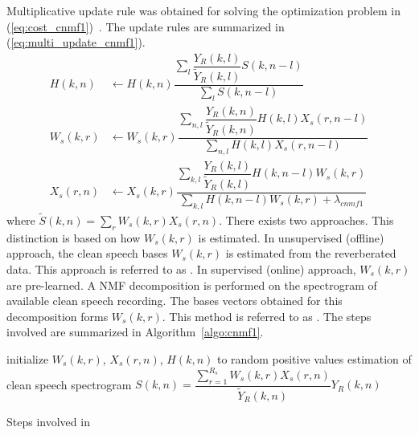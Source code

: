 Multiplicative update rule was obtained for solving the optimization problem in (\ref{eq:cost_cnmf1})~\cite{mohammadiha2016speech, Mohammadiha2015}. The update rules are summarized in (\ref{eq:multi_update_cnmf1}).
\begin{align}
H(k,n) & \leftarrow H(k,n) \dfrac{\sum\limits_l\dfrac{Y_R(k,l)}{\tilde{Y}_R(k,l)}S(k,n-l)}{\sum\limits_l S(k,n-l) } \nonumber \\
W_s(k,r) & \leftarrow W_s(k,r) \dfrac{\sum\limits_{n,l}\dfrac{Y_R(k,n)}{\tilde{Y}_R(k,n)} H(k,l)X_s(r,n-l)}{\sum\limits_{n,l} H(k,l)X_s(r,n-l)} \nonumber \\
X_s(r,n) & \leftarrow X_s(k,r) \dfrac{\sum\limits_{k,l}\dfrac{Y_R(k,l)}{\tilde{Y}_R(k,l)} H(k,n-l)W_s(k,r)}{\sum\limits_{k,l} H(k,n-l)W_s(k,r)+\lambda_{cnmf1}}
\label{eq:multi_update_cnmf1}
\end{align}
where $\tilde{S}(k,n)=\sum\limits_r W_s(k,r)X_s(r,n)$.
There exists two approaches. This distinction is based on how $W_s(k,r)$ is estimated. In unsupervised (offline) approach, the clean speech bases $W_s(k,r)$ is estimated from the reverberated data. This approach is referred to as . In supervised (online) approach, $W_s(k,r)$ are pre-learned. A NMF decomposition is performed on the spectrogram of available clean speech recording. The bases vectors obtained for this decomposition forms $W_s(k,r)$. This method is referred to as . The steps involved are summarized in Algorithm~\ref{algo:cnmf1}. 

\begin{algorithm}[H]
\SetAlgoLined
{}
 initialize $W_s(k,r)$, $X_s(r,n)$, $H(k,n)$ to random positive values\;
  estimation of clean speech spectrogram 
  $S(k,n)=\dfrac{\sum\limits_{r=1}^{R_s} W_s(k,r)X_s(r,n)}{\tilde{Y}_R(k,n)}Y_R(k,n)$
 \caption{Steps involved in  }
 \label{algo:cnmf1}
\end{algorithm}

